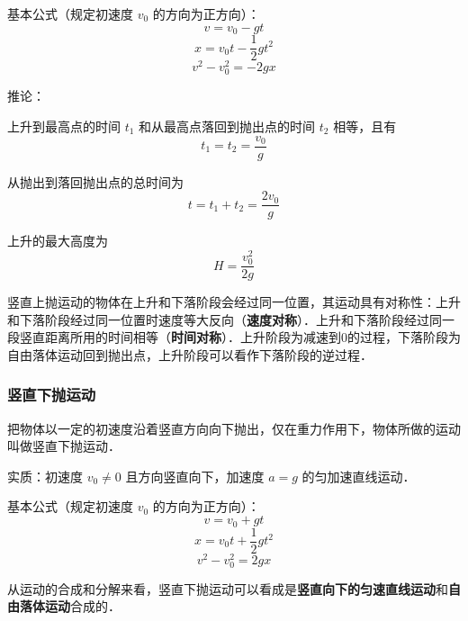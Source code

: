 基本公式（规定初速度 $v_0$ 的方向为正方向）：
\begin{equation}
v=v_0-gt
\end{equation}
\begin{equation}
x=v_0t-\frac12gt^2
\end{equation}
\begin{equation}
v^2-v_0^2=-2gx
\end{equation}

推论：

上升到最高点的时间 $t_1$ 和从最高点落回到抛出点的时间 $t_2$ 相等，且有
\begin{equation}
t_1=t_2=\frac{v_0}{g}
\end{equation}

从抛出到落回抛出点的总时间为
\begin{equation}
t=t_1+t_2=\frac{2v_0}{g}
\end{equation}

上升的最大高度为
\begin{equation}
H=\frac{v_0^2}{2g}
\end{equation}

竖直上抛运动的物体在上升和下落阶段会经过同一位置，其运动具有对称性：上升和下落阶段经过同一位置时速度等大反向（\textbf{速度对称}）．上升和下落阶段经过同一段竖直距离所用的时间相等（\textbf{时间对称}）．上升阶段为减速到0的过程，下落阶段为自由落体运动回到抛出点，上升阶段可以看作下落阶段的逆过程．

\subsubsection{竖直下抛运动}
把物体以一定的初速度沿着竖直方向向下抛出，仅在重力作用下，物体所做的运动叫做竖直下抛运动．

实质：初速度 $v_0\neq0$ 且方向竖直向下，加速度 $a=g$ 的匀加速直线运动．

基本公式（规定初速度 $v_0$ 的方向为正方向）：
\begin{equation}
v=v_0+gt
\end{equation}
\begin{equation}
x=v_0t+\frac12gt^2
\end{equation}
\begin{equation}
v^2-v_0^2=2gx
\end{equation}

从运动的合成和分解来看，竖直下抛运动可以看成是\textbf{竖直向下的匀速直线运动}和\textbf{自由落体运动}合成的．